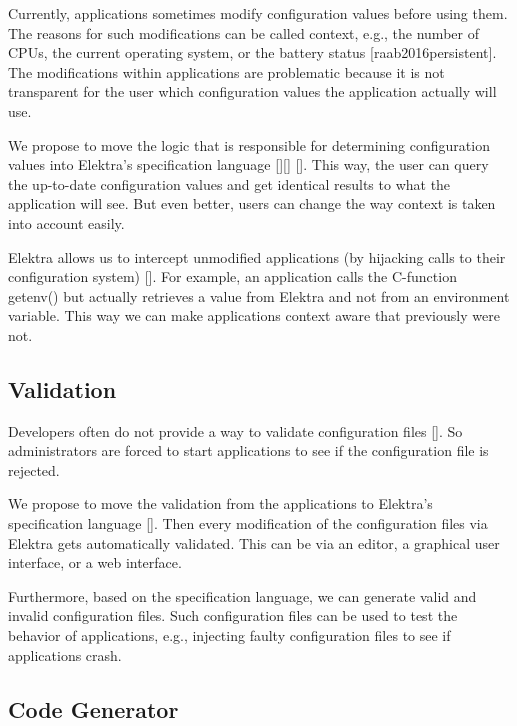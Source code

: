 Currently, applications sometimes modify configuration values before using them. The reasons for such modifications can be called context, e.\+g., the number of C\+P\+Us, the current operating system, or the battery status \mbox{[}raab2016persistent\mbox{]}. The modifications within applications are problematic because it is not transparent for the user which configuration values the application actually will use.

We propose to move the logic that is responsible for determining configuration values into Elektra’s specification language \mbox{[}\mbox{]}\mbox{[}\mbox{]} \mbox{[}\mbox{]}. This way, the user can query the up-\/to-\/date configuration values and get identical results to what the application will see. But even better, users can change the way context is taken into account easily.

Elektra allows us to intercept unmodified applications (by \textquotesingle{}\textquotesingle{}hijacking\textquotesingle{}\textquotesingle{} calls to their configuration system) \mbox{[}\mbox{]}. For example, an application calls the C-\/function getenv() but actually retrieves a value from Elektra and not from an environment variable. This way we can make applications context aware that previously were not.

\subsection*{Validation}

Developers often do not provide a way to validate configuration files \mbox{[}\mbox{]}. So administrators are forced to start applications to see if the configuration file is rejected.

We propose to move the validation from the applications to Elektra’s specification language \mbox{[}\mbox{]}. Then every modification of the configuration files via Elektra gets automatically validated. This can be via an editor, a graphical user interface, or a web interface.

Furthermore, based on the specification language, we can generate valid and invalid configuration files. Such configuration files can be used to test the behavior of applications, e.\+g., injecting faulty configuration files to see if applications crash.

\subsection*{Code Generator}

